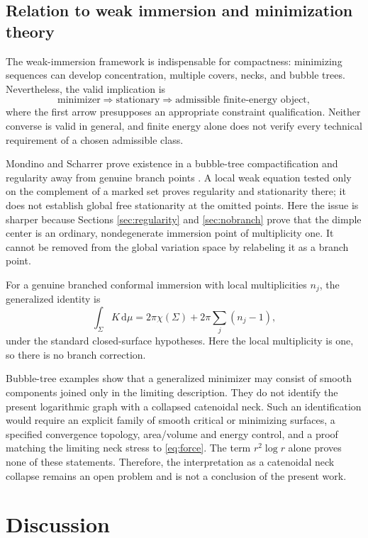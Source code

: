 \documentclass[preprint,amsmath,amssymb,aps,prl,superscriptaddress,nofootinbib,floatfix]{revtex4-2}
\newcommand{\dd}{\,\mathrm d}
\begin{document}
\subsection{Relation to weak immersion and minimization theory}\label{sec:weak}
The weak-immersion framework is indispensable for compactness: minimizing sequences can develop concentration, multiple covers, necks, and bubble trees. Nevertheless, the valid implication is
\[
\text{minimizer}\Longrightarrow\text{stationary}\Longrightarrow\text{admissible finite-energy object},
\]
where the first arrow presupposes an appropriate constraint qualification. Neither converse is valid in general, and finite energy alone does not verify every technical requirement of a chosen admissible class.

Mondino and Scharrer prove existence in a bubble-tree compactification and regularity away from genuine branch points \cite{MondinoScharrer2020}. A local weak equation tested only on the complement of a marked set proves regularity and stationarity there; it does not establish global free stationarity at the omitted points. Here the issue is sharper because Sections \ref{sec:regularity} and \ref{sec:nobranch} prove that the dimple center is an ordinary, nondegenerate immersion point of multiplicity one. It cannot be removed from the global variation space by relabeling it as a branch point.

For a genuine branched conformal immersion with local multiplicities \(n_j\), the generalized identity is
\begin{equation}
\int_\Sigma K\dd\mu=2\pi\chi(\Sigma)+2\pi\sum_j(n_j-1),\label{eq:branchedGB}
\end{equation}
under the standard closed-surface hypotheses. Here the local multiplicity is one, so there is no branch correction.

Bubble-tree examples show that a generalized minimizer may consist of smooth components joined only in the limiting description. They do not identify the present logarithmic graph with a collapsed catenoidal neck. Such an identification would require an explicit family of smooth critical or minimizing surfaces, a specified convergence topology, area/volume and energy control, and a proof matching the limiting neck stress to \eqref{eq:force}. The term \(r^2\log r\) alone proves none of these statements. Therefore, the interpretation as a catenoidal neck collapse remains an open problem and is not a conclusion of the present work.

\section{Discussion}\label{sec:discussion}
\end{document}
